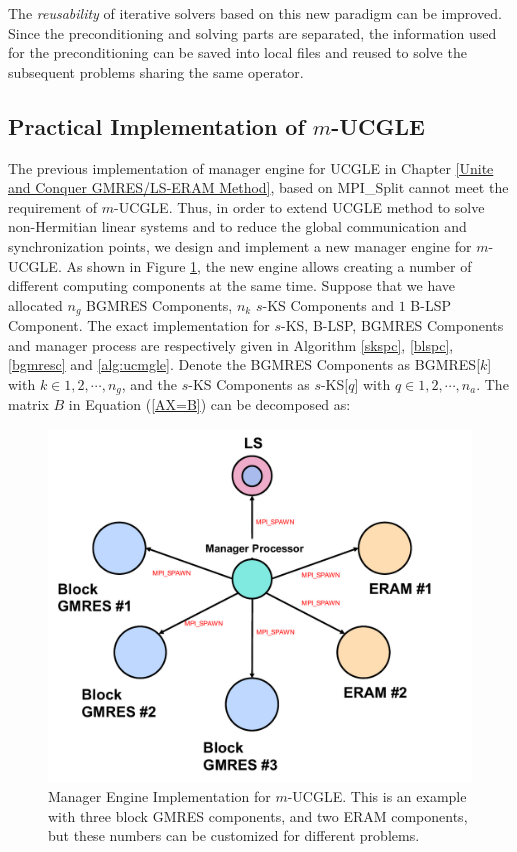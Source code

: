 The \textit{reusability} of iterative solvers based on this new paradigm can be improved. Since the preconditioning and solving parts are separated, the information used for the preconditioning can be saved into local files and reused to solve the subsequent problems sharing the same operator.

\subsection{Practical Implementation of $m$-UCGLE}

The previous implementation of manager engine for UCGLE in Chapter \ref{Unite and Conquer GMRES/LS-ERAM Method}, based on MPI\_Split cannot meet the requirement of $m$-UCGLE. Thus, in order to extend UCGLE method to solve non-Hermitian linear systems and to reduce the global communication and synchronization points, we design and implement a new manager engine for $m$-UCGLE. As shown in Figure \ref{fig:ucmgle}, the new engine allows creating a number of different computing components at the same time. Suppose that we have allocated $n_g$ BGMRES Components, $n_k$ $s$-KS Components and $1$ B-LSP Component. The exact implementation for $s$-KS, B-LSP, BGMRES Components and manager process are respectively given in Algorithm \ref{skspc}, \ref{blspc}, \ref{bgmresc} and \ref{alg:ucmgle}. Denote the BGMRES Components as BGMRES[$k$] with $k \in 1, 2, \cdots, n_g$, and the $s$-KS Components as $s$-KS[$q$] with $q \in 1, 2, \cdots, n_a$.   The matrix $B$ in Equation (\ref{AX=B}) can be decomposed as:

\begin{figure}[t]
	\centering
	\includegraphics[width=0.9\linewidth]{fig/ucmgle.pdf}
	\caption{Manager Engine Implementation for $m$-UCGLE. This is an example with three block GMRES components, and two ERAM components, but these numbers can be customized for different problems.}
	\label{fig:ucmgle}
\end{figure}

